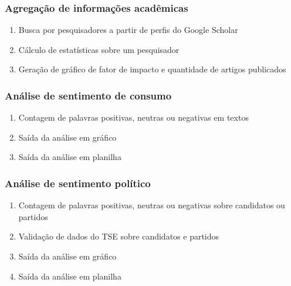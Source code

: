 \subsubsection{Agregação de informações acadêmicas}
\begin{enumerate}
\item Busca por pesquisadores a partir de perfis do Google Scholar
\item Cálculo de estatísticas sobre um pesquisador
\item Geração de gráfico de fator de impacto e quantidade de artigos publicados
\end{enumerate}

\subsubsection{Análise de sentimento de consumo}
\begin{enumerate}
\item Contagem de palavras positivas, neutras ou negativas em textos
\item Saída da análise em gráfico
\item Saída da análise em planilha
\end{enumerate}

\subsubsection{Análise de sentimento político}
\begin{enumerate}
\item Contagem de palavras positivas, neutras ou negativas sobre candidatos ou partidos
\item Validação de dados do TSE sobre candidatos e partidos
\item Saída da análise em gráfico
\item Saída da análise em planilha
\end{enumerate}

